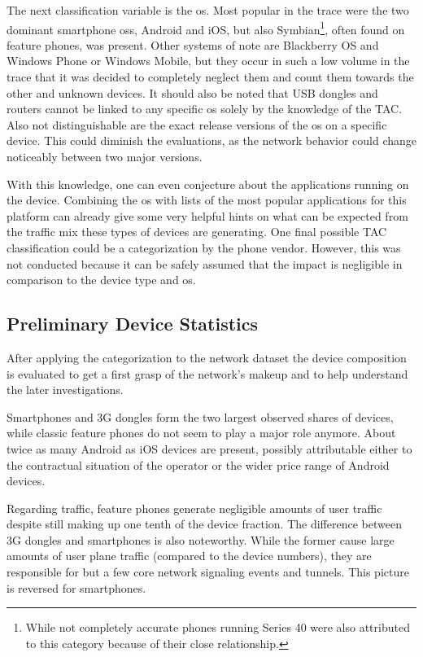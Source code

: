 The next classification variable is the \gls{os}. Most popular in the trace were the two dominant smartphone \glspl{os}, Android and iOS, but also Symbian\footnote{While not completely accurate phones running Series 40 were also attributed to this category because of their close relationship.}, often found on feature phones, was present. Other systems of note are Blackberry OS and Windows Phone or Windows Mobile, but they occur in such a low volume in the trace that it was decided to completely neglect them and count them towards the other and unknown devices. It should also be noted that USB dongles and routers cannot be linked to any specific \gls{os} solely by the knowledge of the \gls{TAC}. Also not distinguishable are the exact release versions of the \gls{os} on a specific device. This could diminish the evaluations, as the network behavior could change noticeably between two major versions.

With this knowledge, one can even conjecture about the applications running on the device. Combining the \gls{os} with lists of the most popular applications for this platform can already give some very helpful hints on what can be expected from the traffic mix these types of devices are generating. One final possible \gls{TAC} classification could be a categorization by the phone vendor. 
However, this was not conducted because it can be safely assumed that the impact is negligible in comparison to the device type and \gls{os}.


\subsection{Preliminary Device Statistics}

After applying the categorization to the network dataset the device composition is evaluated to get a first grasp of the network's makeup and to help understand the later investigations.

Smartphones and \gls{3G} dongles form the two largest observed shares of devices, while classic feature phones do not seem to play a major role anymore. About twice as many Android as iOS devices are present, possibly attributable either to the contractual situation of the operator or the wider price range of Android devices.

Regarding traffic, feature phones generate negligible amounts of user traffic despite still making up one tenth of the device fraction. The difference between \gls{3G} dongles and smartphones is also noteworthy. While the former cause large amounts of user plane traffic (compared to the device numbers), they are responsible for but a few core network signaling events and tunnels. This picture is reversed for smartphones.

